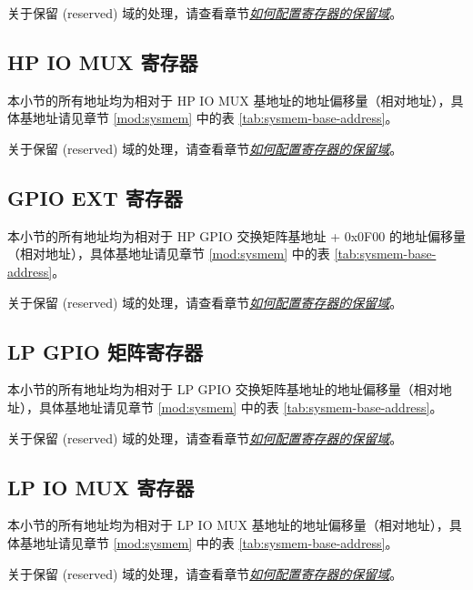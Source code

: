 \documentclass[main\_\_CN.tex]{subfiles}
\begin{document}
关于保留 (reserved) 域的处理，请查看章节\hyperref[programming-reserved-field]{\textit{如何配置寄存器的保留域}}。



\subsection{HP IO MUX 寄存器}
本小节的所有地址均为相对于 HP IO MUX 基地址的地址偏移量（相对地址），具体基地址请见章节 \ref{mod:sysmem} \textit{} 中的表 \ref{tab:sysmem-base-address}。

关于保留 (reserved) 域的处理，请查看章节\hyperref[programming-reserved-field]{\textit{如何配置寄存器的保留域}}。



\subsection{GPIO EXT 寄存器}

本小节的所有地址均为相对于 HP GPIO 交换矩阵基地址 + 0x0F00 的地址偏移量（相对地址），具体基地址请见章节 \ref{mod:sysmem} \textit{} 中的表 \ref{tab:sysmem-base-address}。

关于保留 (reserved) 域的处理，请查看章节\hyperref[programming-reserved-field]{\textit{如何配置寄存器的保留域}}。



\subsection{LP GPIO 矩阵寄存器}
本小节的所有地址均为相对于 LP GPIO 交换矩阵基地址的地址偏移量（相对地址），具体基地址请见章节 \ref{mod:sysmem} \textit{} 中的表 \ref{tab:sysmem-base-address}。

关于保留 (reserved) 域的处理，请查看章节\hyperref[programming-reserved-field]{\textit{如何配置寄存器的保留域}}。



\subsection{LP IO MUX 寄存器}
本小节的所有地址均为相对于 LP IO MUX 基地址的地址偏移量（相对地址），具体基地址请见章节 \ref{mod:sysmem} \textit{} 中的表 \ref{tab:sysmem-base-address}。

关于保留 (reserved) 域的处理，请查看章节\hyperref[programming-reserved-field]{\textit{如何配置寄存器的保留域}}。


\end{document}
